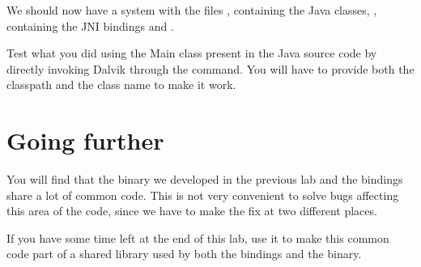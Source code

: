 We should now have a system with the files
, containing the Java
classes, , containing the JNI bindings and
.

Test what you did using the Main class present in the Java source code
by directly invoking Dalvik through the  command. You
will have to provide both the classpath and the class name to make it work.

\section{Going further}

You will find that the binary we developed in the previous lab and
the bindings share a lot of common code. This is not very convenient
to solve bugs affecting this area of the code, since we have to make
the fix at two different places.

If you have some time left at the end of this lab, use it to make this
common code part of a shared library used by both the bindings and the
binary.
